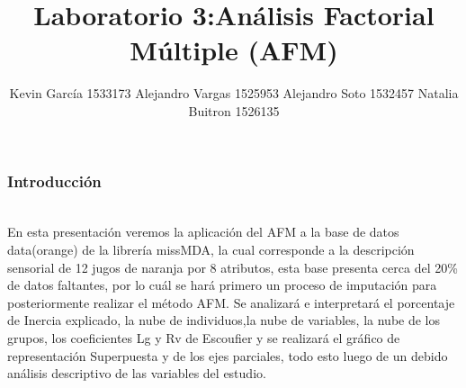 \documentclass[12pt]{beamer}
\author[Kevin - Alejandro x2 - Natalia ]{Kevin García 1533173 \newline Alejandro Vargas 1525953 \newline Alejandro Soto 1532457 \newline Natalia Buitron 1526135}
\title[Análisis Factorial Múltiple (AFM)]{Laboratorio 3:Análisis Factorial Múltiple (AFM)}
\begin{document}
\justify
\begin{frame}
\titlepage
\end{frame}

\begin{frame}
\frametitle{Introducción}
~\\En esta presentación veremos la aplicación del AFM a la base de datos data(orange) de la librería missMDA, la cual corresponde a la descripción sensorial de 12 jugos de naranja por 8 atributos, esta base presenta cerca del 20\% de datos faltantes, por lo cuál se hará primero un proceso de imputación para posteriormente realizar el método AFM. Se analizará e interpretará el porcentaje de Inercia explicado, la nube de individuos,la nube de variables, la nube de los grupos, los coeficientes Lg y Rv de Escoufier y se realizará el gráfico de representación Superpuesta y de los ejes parciales, todo esto luego de un debido análisis descriptivo de las variables del estudio.
\end{frame}
\end{document}
